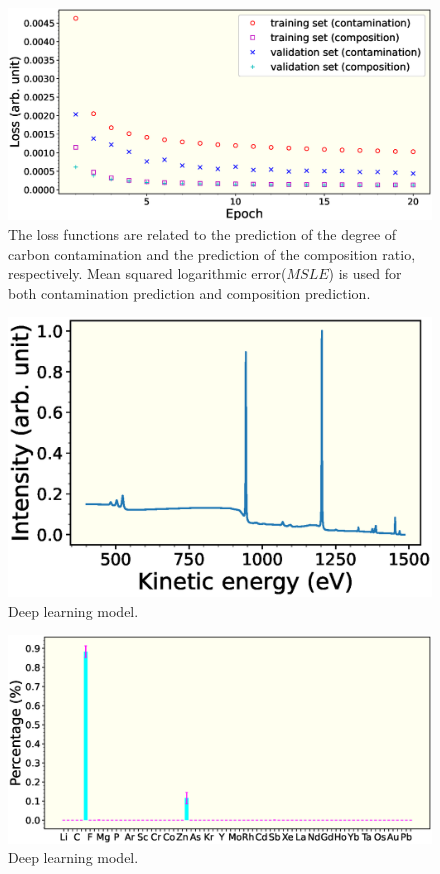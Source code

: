 \documentclass[preprint,aps,floatfix,showpacs]{revtex4-2}
\begin{document}
\begin{figure}
	\includegraphics[width=1.1\columnwidth]{conv1.eps}
	\caption{The loss functions are related to the prediction of the degree of carbon contamination and the prediction of the composition ratio, respectively. Mean squared logarithmic error($MSLE$) is used for both contamination prediction and composition prediction.}
	\label{conv}
\end{figure}



\begin{figure}
	\includegraphics[width=0.99\columnwidth]{new_in.eps}
	\caption{Deep learning model.}
	\label{test1in}
\end{figure}


\begin{figure}
	\includegraphics[width=1.15\columnwidth]{new_out.eps}
	\caption{Deep learning model.}
	\label{test1out}
\end{figure}
\end{document}
